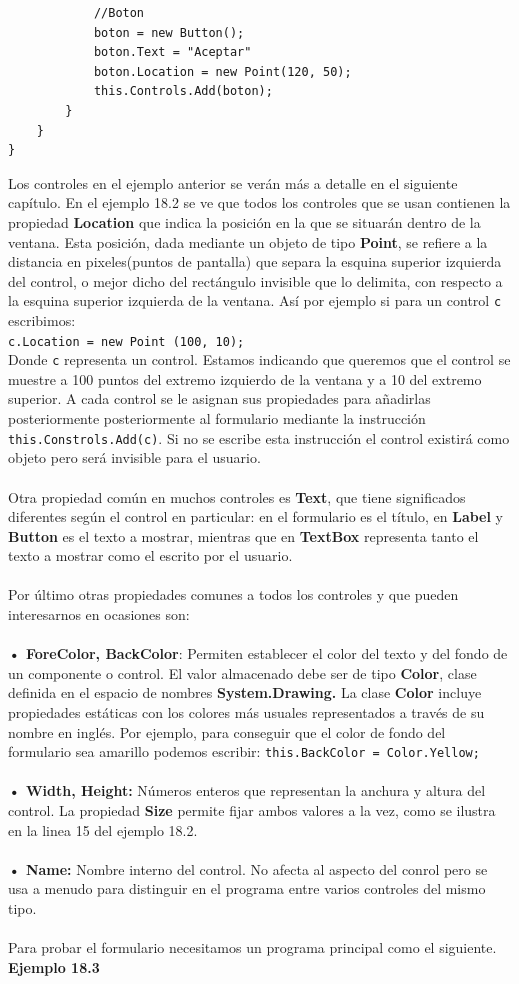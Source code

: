 \documentclass[12pt,a4paper]{report}
\begin{document}
\begin{lstlisting}
			//Boton
			boton = new Button();
			boton.Text = "Aceptar"
			boton.Location = new Point(120, 50);
			this.Controls.Add(boton);
		}	
	}
}
\end{lstlisting}Los controles en el ejemplo anterior se verán más a detalle en el siguiente capítulo. En el ejemplo 18.2 se ve que todos los controles que se usan contienen la propiedad \textbf{Location} que indica la posición en la que se situarán dentro de la ventana. Esta posición, dada mediante un objeto de tipo \textbf{Point}, se refiere a la distancia en pixeles(puntos de pantalla) que separa la esquina superior izquierda del control, o mejor dicho del rectángulo invisible que lo delimita, con respecto a la esquina superior izquierda de la ventana. Así por ejemplo si para un control \texttt{c} escribimos:\\\texttt{c.Location = new Point (100, 10);}\\Donde \texttt{c} representa un control. Estamos indicando que queremos que el control se muestre a 100 puntos del extremo izquierdo de la ventana y a 10 del extremo superior. A cada control se le asignan sus propiedades para añadirlas posteriormente posteriormente al formulario mediante la instrucción \texttt{this.Constrols.Add(c)}. Si no se escribe esta instrucción el control existirá como objeto pero será invisible para el usuario.\\\\Otra propiedad común en muchos controles es \textbf{Text}, que tiene significados diferentes según el control en particular: en el formulario es el título, en \textbf{Label} y \textbf{Button} es el texto a mostrar, mientras que en \textbf{TextBox} representa tanto el texto a mostrar como el escrito por el usuario.\\\\Por último otras propiedades comunes a todos los controles y que pueden interesarnos en ocasiones son: \\\\\textbf{• ForeColor, BackColor}: Permiten establecer el color del texto y del fondo de un componente o control. El valor almacenado debe ser de tipo \textbf{Color}, clase definida en el espacio de nombres \textbf{System.Drawing.} La clase \textbf{Color} incluye propiedades estáticas con los colores más usuales representados a través de su nombre en inglés. Por ejemplo, para conseguir que el color de fondo del formulario sea amarillo podemos escribir: \texttt{this.BackColor = Color.Yellow;}\\\\\textbf{• Width, Height:} Números enteros que representan la anchura y altura del control. La propiedad \textbf{Size} permite fijar ambos valores a la vez, como se ilustra en la linea 15 del ejemplo 18.2.\\\\\textbf{• Name: }Nombre interno del control. No afecta al aspecto del conrol pero se usa a menudo para distinguir en el programa entre varios controles del mismo tipo.\\\\Para probar el formulario necesitamos un programa principal como el siguiente. \\\textbf{Ejemplo 18.3}
\end{document}
